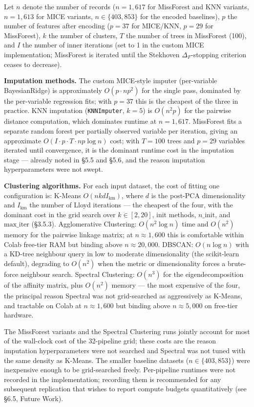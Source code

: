Let $n$ denote the number of records ($n = 1{,}617$ for MissForest and KNN variants, $n = 1{,}613$ for MICE variants, $n \in \{403, 853\}$ for the encoded baselines), $p$ the number of features after encoding ($p = 37$ for MICE/KNN, $p = 29$ for MissForest), $k$ the number of clusters, $T$ the number of trees in MissForest (100), and $I$ the number of inner iterations (set to 1 in the custom MICE implementation; MissForest is iterated until the Stekhoven $\Delta_F$-stopping criterion ceases to decrease).

\textbf{Imputation methods.} The custom MICE-style imputer (per-variable BayesianRidge) is approximately $O(p \cdot n p^2)$ for the single pass, dominated by the per-variable regression fits; with $p = 37$ this is the cheapest of the three in practice. KNN imputation (\texttt{KNNImputer}, $k=5$) is $O(n^2 p)$ for the pairwise distance computation, which dominates runtime at $n = 1{,}617$. MissForest fits a separate random forest per partially observed variable per iteration, giving an approximate $O(I \cdot p \cdot T \cdot n p \log n)$ cost; with $T = 100$ trees and $p = 29$ variables iterated until convergence, it is the dominant runtime cost in the imputation stage --- already noted in \S5.5 and \S5.6, and the reason imputation hyperparameters were not swept.

\textbf{Clustering algorithms.} For each input dataset, the cost of fitting one configuration is: K-Means $O(n k d I_{\mathrm{km}})$, where $d$ is the post-PCA dimensionality and $I_{\mathrm{km}}$ the number of Lloyd iterations --- the cheapest of the four, with the dominant cost in the grid search over $k \in [2, 20]$, init methods, $n\_\mathrm{init}$, and $\mathrm{max\_iter}$ (\S3.5.3). Agglomerative Clustering: $O(n^2 \log n)$ time and $O(n^2)$ memory for the pairwise linkage matrix; at $n \approx 1{,}600$ this is comfortable within Colab free-tier RAM but binding above $n \approx 20{,}000$. DBSCAN: $O(n \log n)$ with a KD-tree neighbour query in low to moderate dimensionality (the scikit-learn default), degrading to $O(n^2)$ when the metric or dimensionality forces a brute-force neighbour search. Spectral Clustering: $O(n^3)$ for the eigendecomposition of the affinity matrix, plus $O(n^2)$ memory --- the most expensive of the four, the principal reason Spectral was not grid-searched as aggressively as K-Means, and tractable on Colab at $n \approx 1{,}600$ but binding above $n \approx 5{,}000$ on free-tier hardware.

The MissForest variants and the Spectral Clustering runs jointly account for most of the wall-clock cost of the 32-pipeline grid; these costs are the reason imputation hyperparameters were not searched and Spectral was not tuned with the same density as K-Means. The smaller baseline datasets ($n \in \{403, 853\}$) were inexpensive enough to be grid-searched freely. Per-pipeline runtimes were not recorded in the implementation; recording them is recommended for any subsequent replication that wishes to report compute budgets quantitatively (see \S6.5, Future Work).

